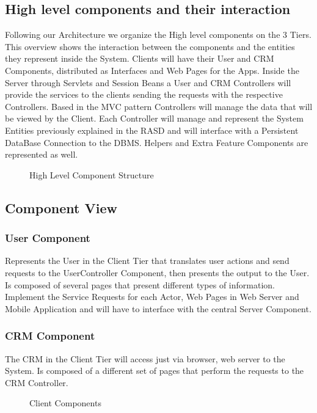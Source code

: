 \documentclass[a4paper]{article}
\begin{document}
\subsection{High level components and their interaction}
Following our Architecture we organize the High level components on the 3 Tiers. This overview shows the interaction between the components and the entities they represent inside the System. Clients will have their User and CRM Components, distributed as Interfaces and Web Pages for the Apps. Inside the Server through Servlets and Session Beans a User and CRM Controllers will provide the services to the clients sending the requests with the respective Controllers. Based in the MVC pattern Controllers will manage the data that will be viewed by the Client. Each Controller will manage and represent the System Entities previously explained in the RASD and will interface with a Persistent DataBase Connection to the DBMS. Helpers and Extra Feature Components are represented as well.

\begin{figure}[h]
\centering
\vspace*{\fill}
\noindent{}%
\caption {High Level Component Structure}
\vspace*{0.5cm}
\end{figure}

\subsection{Component View}
\subsubsection{User Component}
Represents the User in the Client Tier that translates user actions and send requests to the UserController Component, then presents the output to the User. Is composed of several pages that present different types of information. Implement the Service Requests for each Actor, Web Pages in Web Server and Mobile Application and will have to interface with the central Server Component.
\subsubsection{CRM Component}
The CRM in the Client Tier will access just via browser, web server to the System. Is composed of a different set of pages that perform the requests to the CRM Controller.
\begin{figure}[h]
\centering
\vspace*{\fill}
\noindent{}%
\caption {Client Components}
\vspace*{0.5cm}
\end{figure}
\end{document}
